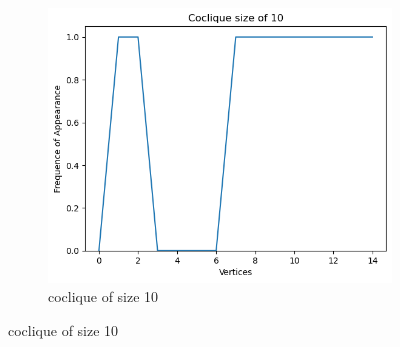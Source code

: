 \documentclass{amsart}
\theoremstyle{definition}
\begin{document}
\begin{appendix}
\begin{figure}[hbt!]
\begin{subfigure}[b]{.45\textwidth}
		\includegraphics[width=1\linewidth]{depth_4_size_10.png}
		\caption{coclique of size 10}
	\end{subfigure}
\end{figure}


\end{appendix}
\end{document}
